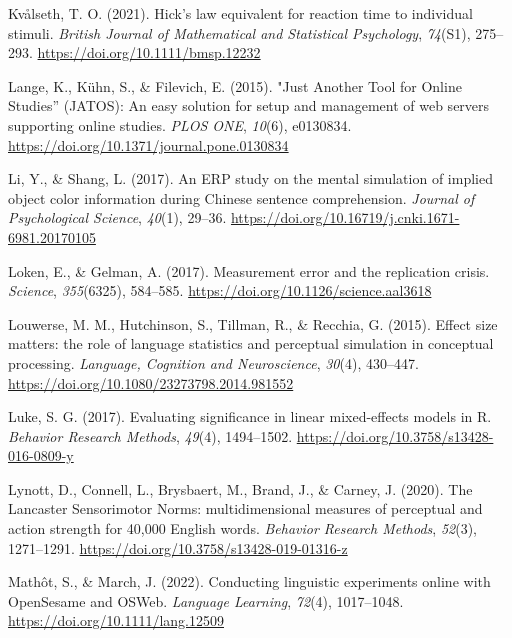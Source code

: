 \documentclass[
  man,floatsintext]{apa7}
\newlength{\cslhangindent}
\newlength{\cslentryspacingunit} %
\newenvironment{CSLReferences}[2] %
 {%
  \setlength{\parindent}{0pt}
  \ifodd #1
  \let\oldpar\par
  \def\par{\hangindent=\cslhangindent\oldpar}
  \fi
  \setlength{\parskip}{#2\cslentryspacingunit}
 }%
 {}
\begin{document}
\begin{CSLReferences}{1}{0}
\leavevmode{}%
Kvålseth, T. O. (2021). Hick's law equivalent for reaction time to individual stimuli. \emph{British Journal of Mathematical and Statistical Psychology}, \emph{74}(S1), 275--293. \url{https://doi.org/10.1111/bmsp.12232}

\leavevmode{}%
Lange, K., Kühn, S., \& Filevich, E. (2015). "{Just Another Tool} for {Online Studies}'' ({JATOS}): {An} easy solution for setup and management of web servers supporting online studies. \emph{PLOS ONE}, \emph{10}(6), e0130834. \url{https://doi.org/10.1371/journal.pone.0130834}

\leavevmode{}%
Li, Y., \& Shang, L. (2017). {An ERP study on the mental simulation of implied object color information during Chinese sentence comprehension}. \emph{Journal of Psychological Science}, \emph{40}(1), 29--36. \url{https://doi.org/10.16719/j.cnki.1671-6981.20170105}

\leavevmode{}%
Loken, E., \& Gelman, A. (2017). Measurement error and the replication crisis. \emph{Science}, \emph{355}(6325), 584--585. \url{https://doi.org/10.1126/science.aal3618}

\leavevmode{}%
Louwerse, M. M., Hutchinson, S., Tillman, R., \& Recchia, G. (2015). Effect size matters: the role of language statistics and perceptual simulation in conceptual processing. \emph{Language, Cognition and Neuroscience}, \emph{30}(4), 430--447. \url{https://doi.org/10.1080/23273798.2014.981552}

\leavevmode{}%
Luke, S. G. (2017). Evaluating significance in linear mixed-effects models in {R}. \emph{Behavior Research Methods}, \emph{49}(4), 1494--1502. \url{https://doi.org/10.3758/s13428-016-0809-y}

\leavevmode{}%
Lynott, D., Connell, L., Brysbaert, M., Brand, J., \& Carney, J. (2020). The Lancaster Sensorimotor Norms: multidimensional measures of perceptual and action strength for 40,000 English words. \emph{Behavior Research Methods}, \emph{52}(3), 1271--1291. \url{https://doi.org/10.3758/s13428-019-01316-z}

\leavevmode{}%
Mathôt, S., \& March, J. (2022). Conducting {linguistic} {experiments} {online} {with} {OpenSesame} and {OSWeb}. \emph{Language Learning}, \emph{72}(4), 1017--1048. \url{https://doi.org/10.1111/lang.12509}


\end{CSLReferences}
\end{document}
